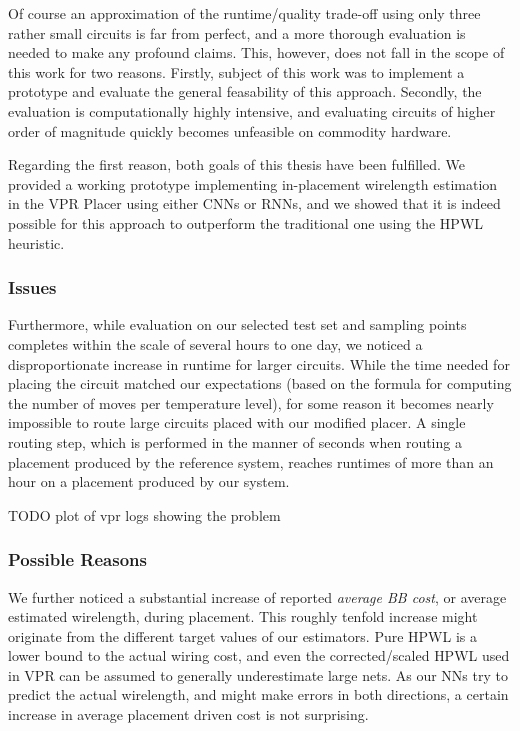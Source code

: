 Of course an approximation of the runtime/quality trade-off using only three rather small circuits is far from perfect, and a more thorough evaluation is needed to make any profound claims. This, however, does not fall in the scope of this work for two reasons. Firstly, subject of this work was to implement a prototype and evaluate the general feasability of this approach. Secondly, the evaluation is computationally highly intensive, and evaluating circuits of higher order of magnitude quickly becomes unfeasible on commodity hardware.

Regarding the first reason, both goals of this thesis have been fulfilled. We provided a working prototype implementing in-placement wirelength estimation in the \gls{VPR} Placer using either \glspl{CNN} or \glspl{RNN}, and we showed that it is indeed possible for this approach to outperform the traditional one using the \gls{HPWL} heuristic.

\subsubsection{Issues}

Furthermore, while evaluation on our selected test set and sampling points completes within the scale of several hours to one day, we noticed a disproportionate increase in runtime for larger circuits. While the time needed for placing the circuit matched our expectations (based on the formula for computing the number of moves per temperature level), for some reason it becomes nearly impossible to route large circuits placed with our modified placer. A single routing step, which is performed in the manner of seconds when routing a placement produced by the reference system, reaches runtimes of more than an hour on a placement produced by our system.

TODO plot of vpr logs showing the problem

\subsubsection{Possible Reasons}

We further noticed a substantial increase of reported \textit{average \gls{BB} cost}, or average estimated wirelength, during placement. This roughly tenfold increase might originate from the different target values of our estimators. Pure \gls{HPWL} is a lower bound to the actual wiring cost, and even the corrected/scaled \gls{HPWL} used in \gls{VPR} can be assumed to generally underestimate large nets. As our \glspl{NN} try to predict the actual wirelength, and might make errors in both directions, a certain increase in average placement driven cost is not surprising.

